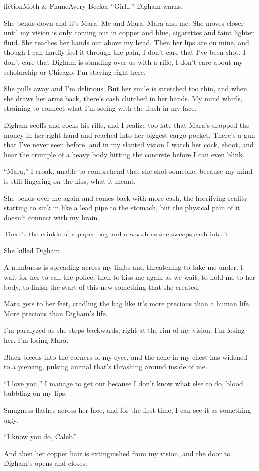 \begin{prose}{fiction}{Moth \& Flame}{Avery Becker}
“Girl…” Digham warns.\par
She bends down and it's Mara. Me and Mara. Mara and me. She moves closer until my vision is only coming out in copper and blue, cigarettes and faint lighter fluid. She reaches her hands out above my head. Then her lips are on mine, and though I can hardly feel it through the pain, I don't care that I've been shot, I don't care that Digham is standing over us with a rifle, I don't care about my scholarship or Chicago. I'm staying right here. \par
She pulls away and I'm delirious. But her smile is stretched too thin, and when she draws her arms back, there's cash clutched in her hands. My mind whirls, straining to connect what I'm seeing with the flush in my face.\par
Digham scoffs and cocks his rifle, and I realize too late that Mara's dropped the money in her right hand and reached into her biggest cargo pocket. There's a gun that I've never seen before, and in my slanted vision I watch her cock, shoot, and hear the crumple of a heavy body hitting the concrete before I can even blink. \par
“Mara,” I croak, unable to comprehend that she shot someone, because my mind is still lingering on the kiss, what it meant.\par
She bends over me again and comes back with more cash, the horrifying reality starting to sink in like a lead pipe to the stomach, but the physical pain of it doesn't connect with my brain. \par
There's the crinkle of a paper bag and a woosh as she sweeps cash into it. \par
She killed Digham.\par
A numbness is spreading across my limbs and threatening to take me under. I wait for her to call the police, then to kiss me again as we wait, to hold me to her body, to finish the start of this new something that she created.\par
Mara gets to her feet, cradling the bag like it's more precious than a human life. More precious than Digham's life.\par
I'm paralyzed as she steps backwards, right at the rim of my vision. I'm losing her. I'm losing Mara. \par
Black bleeds into the corners of my eyes, and the ache in my chest has widened to a piercing, pulsing animal that's thrashing around inside of me. \par
“I love you,” I manage to get out because I don't know what else to do, blood bubbling on my lips.\par
Smugness flashes across her face, and for the first time, I can see it as something ugly. \par
“I know you do, Caleb.” \par
And then her copper hair is extinguished from my vision, and the door to Digham's opens and closes.
\end{prose}

